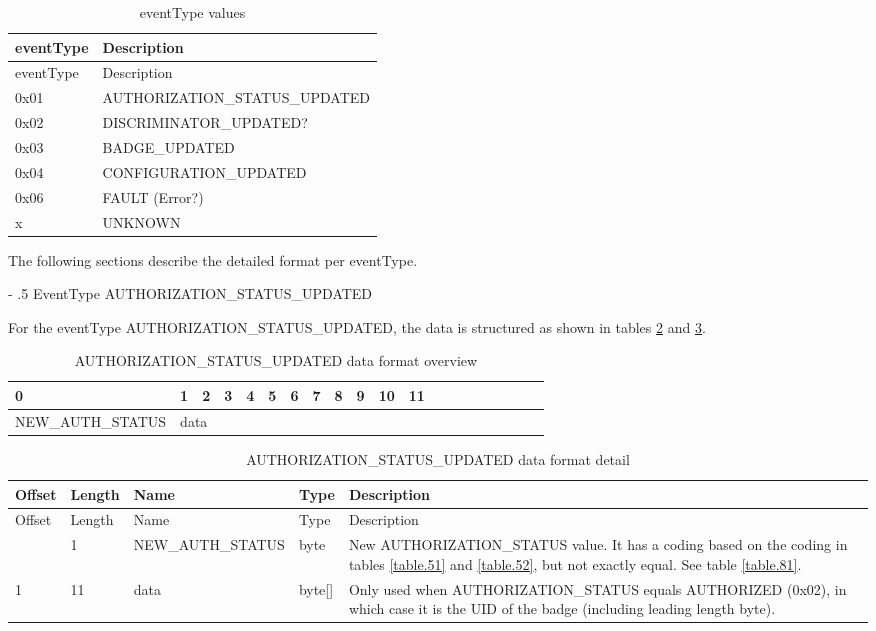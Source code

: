 \documentclass[a4paper]{article}
\makeatletter
\renewcommand\subparagraph{%
   \@startsection{subparagraph}{5}{0mm}%
      {-\baselineskip}%
      {.5\baselineskip}%
      {\normalfont\normalsize\itshape}}
\makeatother
\begin{document}
\begin{longtable}[]{@{}ll@{}}
	\caption{eventType values}
	\label{table.79}
	\tabularnewline
	\toprule\noalign{}
	eventType & Description    \\
	\midrule\noalign{}
	\endfirsthead
	\toprule\noalign{}
	eventType & Description    \\
	\midrule\noalign{}
	\endhead
	\bottomrule\noalign{}
	\endlastfoot
	0x01  & AUTHORIZATION\_STATUS\_UPDATED \\
	0x02  & DISCRIMINATOR\_UPDATED? \\
	0x03  & BADGE\_UPDATED \\
	0x04  & CONFIGURATION\_UPDATED \\
	0x06  & FAULT (Error?) \\
           x & UNKNOWN\\
\end{longtable}

The following sections describe the detailed format per eventType.

\subparagraph{EventType AUTHORIZATION\_STATUS\_UPDATED}
\label{eventType_AUTHORIZATION_STATUS_UPDATED}

For the eventType AUTHORIZATION\_STATUS\_UPDATED, the data is structured as shown in tables \ref{table.94} and  \ref{table.80}.

\begin{longtable}{|l|l|l|l|l|l|l|l|l|l|l|l|l|l|l|l|l|l|l|l|}
	\caption{AUTHORIZATION\_STATUS\_UPDATED data format overview}
	\label{table.94}\\  %
	\hline
	0 & 1 & 2 & 3 & 4 & 5 & 6 & 7 & 8 & 9 & 10 & 11 \\
	\hline
	NEW\_AUTH\_STATUS & 
	\multicolumn{11}{|l|}{data} \\
	\hline
\end{longtable}

\begin{longtable}[]{llllp{7cm}}
	\caption{AUTHORIZATION\_STATUS\_UPDATED data format detail}
	\label{table.80}
	\tabularnewline
	\toprule\noalign{}
	Offset & Length & Name    & Type     & Description   \\
	\midrule\noalign{}
	\endfirsthead
	\toprule\noalign{}
	Offset & Length & Name      & Type       & Description                                \\
	\midrule\noalign{}
	\endhead
	\bottomrule\noalign{}
	\endlastfoot
	0      & 1      & NEW\_AUTH\_STATUS & byte   &  New AUTHORIZATION\_STATUS value.
	It has a coding based on the coding in tables \ref{table.51} and \ref{table.52}, but not exactly equal.
	See table \ref{table.81}. \\
	1      & 11     & data      & byte{[}{]} & Only used when AUTHORIZATION\_STATUS equals AUTHORIZED (0x02), in which case it is the UID of the badge (including leading length byte).	\\
\end{longtable}
\end{document}
